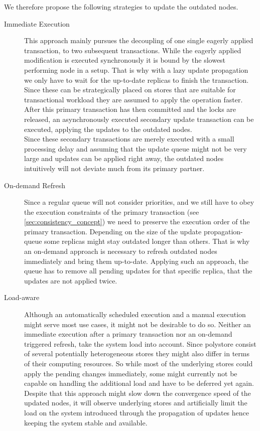 We therefore propose the following strategies to update the outdated nodes.

\begin{description}
    \item[Immediate Execution] This approach mainly pursues the decoupling of one single eagerly applied transaction, to two subsequent transactions.
    While the eagerly applied modification is executed synchronously it is bound by the slowest performing node in a setup.
    That is why with a lazy update propagation we only have to wait for the up-to-date replicas to finish the transaction.
    Since these can be strategically placed on stores that are suitable for transactional workload they are assumed to apply the operation faster.
    After this primary transaction has then committed and the locks are released, an asynchronously executed secondary update transaction can be executed, 
    applying the updates to the outdated nodes.\\
    Since these secondary transactions are merely executed with a small processing delay and assuming that the update queue might not be very large and 
    updates can be applied right away, the outdated nodes intuitively will not deviate much from its primary partner.

    \item[On-demand Refresh] Since a regular queue will not consider priorities, and we still have to obey the execution constraints of the primary transaction (see \ref{sec:consistency_concept})
    we need to preserve the execution order of the primary transaction. Depending on the size of the update propagation-queue some replicas might stay outdated longer than others.
    That is why an on-demand approach is necessary to refresh outdated nodes immediately and bring them up-to-date.
    Applying such an approach, the queue has to remove all pending updates for that specific replica, that the updates are not applied twice. 
    
    \item[Load-aware] Although an automatically scheduled execution and a manual execution might serve most use cases, it might not be desirable to do so.
    Neither an immediate execution after a primary transaction nor an on-demand triggered refresh, take the system load into account.
    Since polystore consist of several potentially heterogeneous stores they might also differ in terms of their computing resources.
    So while most of the underlying stores could apply the pending changes immediately, some might currently not be capable on handling the additional load and have to 
    be deferred yet again. Despite that this approach might slow down the convergence speed of the updated nodes, 
    it will observe underlying stores and artificially limit the load on the system introduced through the propagation of updates hence keeping the system stable and available.


\end{description}

